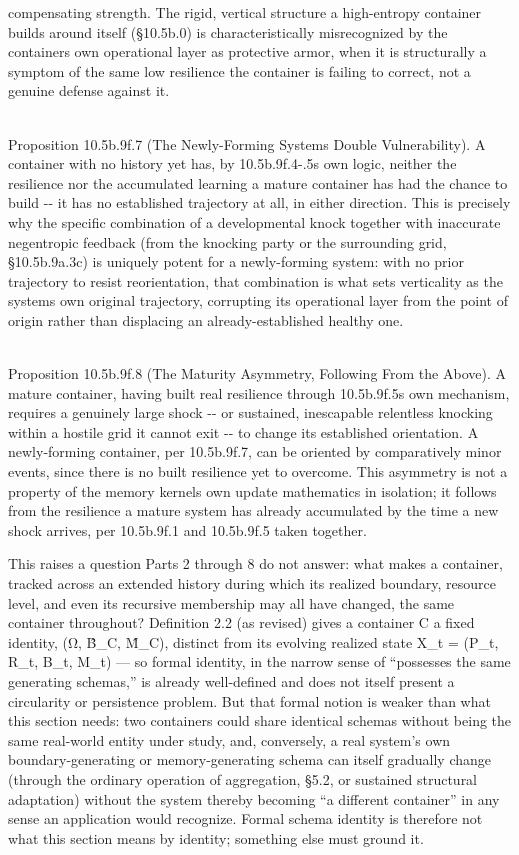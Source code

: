 \documentclass[
]{article}
\begin{document}
compensating strength. The rigid, vertical structure a high-entropy
container builds around itself (§10.5b.0) is characteristically
misrecognized by the container\textquotesingle s own operational layer
as protective armor, when it is structurally a symptom of the same low
resilience the container is failing to correct, not a genuine defense
against it.\\
\strut \\
Proposition 10.5b.9f.7 (The Newly-Forming System\textquotesingle s
Double Vulnerability). A container with no history yet has, by
10.5b.9f.4-.5\textquotesingle s own logic, neither the resilience nor
the accumulated learning a mature container has had the chance to build
-\/- it has no established trajectory at all, in either direction. This
is precisely why the specific combination of a developmental knock
together with inaccurate negentropic feedback (from the knocking party
or the surrounding grid, §10.5b.9a.3c) is uniquely potent for a
newly-forming system: with no prior trajectory to resist reorientation,
that combination is what sets verticality as the
system\textquotesingle s own original trajectory, corrupting its
operational layer from the point of origin rather than displacing an
already-established healthy one.\\
\strut \\
Proposition 10.5b.9f.8 (The Maturity Asymmetry, Following From the
Above). A mature container, having built real resilience through
10.5b.9f.5\textquotesingle s own mechanism, requires a genuinely large
shock -\/- or sustained, inescapable relentless knocking within a
hostile grid it cannot exit -\/- to change its established orientation.
A newly-forming container, per 10.5b.9f.7, can be oriented by
comparatively minor events, since there is no built resilience yet to
overcome. This asymmetry is not a property of the memory
kernel\textquotesingle s own update mathematics in isolation; it follows
from the resilience a mature system has already accumulated by the time
a new shock arrives, per 10.5b.9f.1 and 10.5b.9f.5 taken together.

This raises a question Parts 2 through 8 do not answer: what makes a
container, tracked across an extended history during which its realized
boundary, resource level, and even its recursive membership may all have
changed, the same container throughout? Definition 2.2 (as revised)
gives a container C a fixed identity, (Ω, B̂\_C, M̂\_C), distinct from its
evolving realized state X\_t = (P\_t, R\_t, B\_t, M\_t) --- so formal
identity, in the narrow sense of ``possesses the same generating
schemas,'' is already well-defined and does not itself present a
circularity or persistence problem. But that formal notion is weaker
than what this section needs: two containers could share identical
schemas without being the same real-world entity under study, and,
conversely, a real system's own boundary-generating or memory-generating
schema can itself gradually change (through the ordinary operation of
aggregation, §5.2, or sustained structural adaptation) without the
system thereby becoming ``a different container'' in any sense an
application would recognize. Formal schema identity is therefore not
what this section means by identity; something else must ground it.
\end{document}
